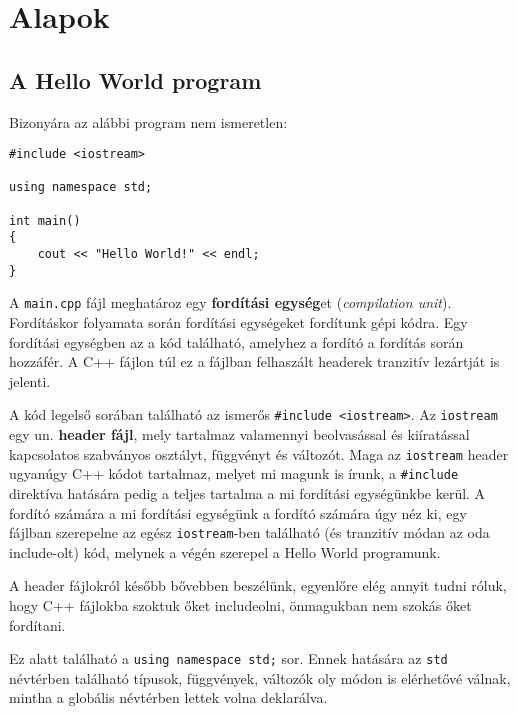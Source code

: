 \documentclass[a4paper,11.5pt,table]{article}
\begin{document}
	\section{Alapok}

	\subsection{A Hello World program}
	Bizonyára az alábbi program nem ismeretlen:
	
	\medskip
	
	\begin{lstlisting}
#include <iostream>

using namespace std;
	
int main()
{
	cout << "Hello World!" << endl;
}
	\end{lstlisting}
	A \texttt{main.cpp} fájl meghatároz egy \textbf{fordítási egység}et (\textit{compilation unit}). Fordításkor folyamata során fordítási egységeket fordítunk gépi kódra. Egy fordítási egységben az a kód található, amelyhez a fordító a fordítás során hozzáfér. A C++ fájlon túl ez a fájlban felhaszált headerek tranzitív lezártját is jelenti.
	
	\medskip
	A kód legelső sorában található az ismerős \texttt{\#include <iostream>}. Az \texttt{iostream} egy un. \textbf{header fájl}, mely tartalmaz valamennyi beolvasással és kiíratással kapcsolatos szabványos osztályt, függvényt és változót. Maga az \texttt{iostream} header ugyanúgy C++ kódot tartalmaz, melyet mi magunk is írunk, a \texttt{\#include} direktíva hatására pedig a teljes tartalma a mi fordítási egységünkbe kerül. A fordító számára a mi fordítási egységünk a fordító számára úgy néz ki, egy fájlban szerepelne az egész \texttt{iostream}-ben található (és tranzitív módan az oda include-olt) kód, melynek a végén szerepel a Hello World programunk.
	
	A header fájlokról később bővebben beszélünk, egyenlőre elég annyit tudni róluk, hogy C++ fájlokba szoktuk őket includeolni, önmagukban nem szokás őket fordítani.
	
	\medskip
	Ez alatt található a \texttt{using namespace std;} sor. Ennek hatására az \texttt{std} névtérben található típusok, függvények, változók oly módon is elérhetővé válnak, mintha a globális névtérben lettek volna deklarálva. 
	
\end{document}
